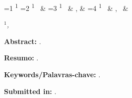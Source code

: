         \begin{center}

            \hfill

            \vspace{1cm}

            {\Large \textbf{\titulonotatecnica}}

            \hfill
            \vspace{.5cm}

            {\large \ifnum\value{numerodeautores}=1 \autornotatecnica\textsuperscript{1} %
                \else \ifnum\value{numerodeautores}=2 \autornotatecnica\textsuperscript{1} \, \&  \segundoautor%
                    \else \ifnum\value{numerodeautores}=3 \autornotatecnica\textsuperscript{1} \, \& \segundoautor, \& \terceiroautor%
                        \else \ifnum\value{numerodeautores}=4 \autornotatecnica\textsuperscript{1} \, \& \segundoautor, \terceiroautor \, \& \quartoautor%
                            \fi
                        \fi
                    \fi
                \fi
            }

            \hfill
            \vspace{.5cm}

            \(^1\)\textit{\filiacaoautordanota, \emailautor}

            \vspace{1.5cm}

            \begin{minipage}{15cm}
                {\textbf{Abstract:}  \abstractnotatecnica.}%
            \end{minipage}

            \vspace{1.5cm}

            \begin{minipage}{15cm}
                \textbf{Resumo:} \resumonotatecnica.%
            \end{minipage}

            \vspace{1.5cm}

            \begin{minipage}{15cm}
                \textbf{Keywords/Palavras-chave:} \keywordsnotatecnica.%
            \end{minipage}

            \vspace{1.5cm}

            \begin{minipage}{15cm}
                \textbf{Submitted in:}  \datanotatecnica.%
            \end{minipage}


\end{center}
